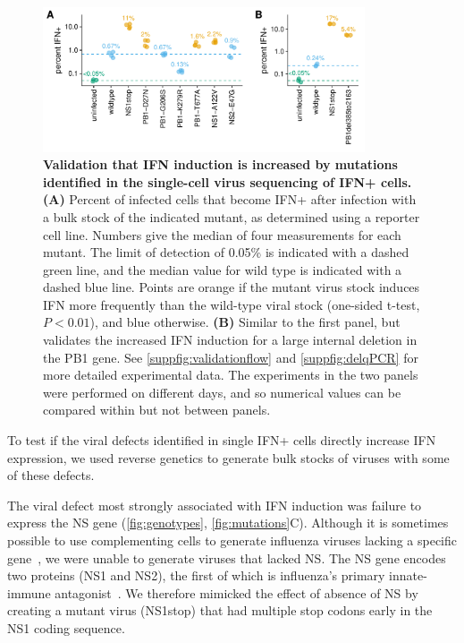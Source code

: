 \documentclass[10pt,letterpaper]{article}
\newcommand{\FIG}[1]{\autoref{fig:#1}}
\newcommand{\SUPPFIG}[1]{\autoref{suppfig:#1}}
\begin{document}
\begin{figure}

\centerline{\includegraphics[width=0.85\textwidth]{figures/Validation_Figure/ifn_plot.pdf}}
\caption{
{\bf Validation that IFN induction is increased by mutations identified in the single-cell virus sequencing of IFN+ cells.}
{\bf (A)}
Percent of infected cells that become IFN+ after infection with a bulk stock of the indicated mutant, as determined using a reporter cell line.
Numbers give the median of four measurements for each mutant.
The limit of detection of 0.05\% is indicated with a dashed green line, and the median value for wild type is indicated with a dashed blue line.
Points are orange if the mutant virus stock induces IFN more frequently than the wild-type viral stock (one-sided t-test, $P < 0.01$), and blue otherwise.
{\bf (B)}
Similar to the first panel, but validates the increased IFN induction for a large internal deletion in the PB1 gene.
See \SUPPFIG{validationflow} and \SUPPFIG{delqPCR} for more detailed experimental data.
The experiments in the two panels were performed on different days, and so numerical values can be compared within but not between panels.
}
\label{fig:validation}

\end{figure}

To test if the viral defects identified in single IFN+ cells directly increase IFN expression, we used reverse genetics to generate bulk stocks of viruses with some of these defects.

The viral defect most strongly associated with IFN induction was failure to express the NS gene (\FIG{genotypes}, \FIG{mutations}C).
Although it is sometimes possible to use complementing cells to generate influenza viruses lacking a specific gene~\citep{fujii2003selective,marsh2007specific}, we were unable to generate viruses that lacked NS.
The NS gene encodes two proteins (NS1 and NS2), the first of which is influenza's primary innate-immune antagonist~\citep{garcia1998influenza, hale2008multifunctional}.
We therefore mimicked the effect of absence of NS by creating a mutant virus (NS1stop) that had multiple stop codons early in the NS1 coding sequence.
\end{document}
